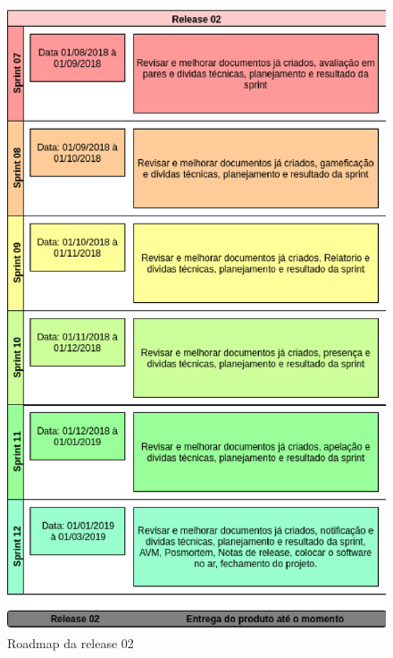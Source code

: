\begin{figure}[h!]
	\centering
  \includegraphics[keepaspectratio=true,scale=0.8]{figuras/roadmap2.eps}
  \caption{Roadmap da release 02}
	\label{fig:roadmap2}
\end{figure}
